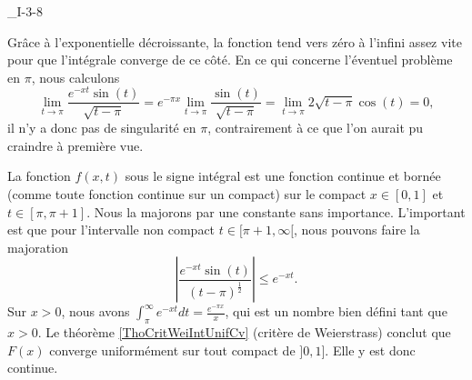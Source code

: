 

\begin{corrige}{_I-3-8}

Grâce à l'exponentielle décroissante, la fonction tend vers zéro à l'infini assez vite pour que l'intégrale converge de ce côté. En ce qui concerne l'éventuel problème en $\pi$, nous calculons
\begin{equation}
	\lim_{t\to\pi}\frac{  e^{-xt}\sin(t) }{ \sqrt{t-\pi} }= e^{-\pi x}\lim_{t\to\pi}\frac{\sin(t) }{ \sqrt{t-\pi} }=\lim_{t\to\pi}2\sqrt{t-\pi}\cos(t)=0,
\end{equation}
il n'y a donc pas de singularité en $\pi$, contrairement à ce que l'on aurait pu craindre à première vue. 

La fonction  $f(x,t)$ sous le signe intégral est une fonction continue et bornée (comme toute fonction continue sur un compact) sur le compact $x\in[0,1]$ et $t\in[\pi,\pi+1]$. Nous la majorons par une constante sans importance. L'important est que pour l'intervalle non compact $t\in[\pi+1,\infty[$, nous pouvons faire la majoration 
\begin{equation}
	\left| \frac{  e^{-xt}\sin(t) }{ (t-\pi)^{\frac{1}{ 2 }} } \right| \leq e^{-xt}.
\end{equation}
Sur $x>0$, nous avons $\int_{\pi}^{\infty} e^{-xt}dt=\frac{  e^{-\pi x} }{ x }$, qui est un nombre bien défini tant que $x>0$. Le théorème \ref{ThoCritWeiIntUnifCv} (critère de Weierstrass) conclut que $F(x)$ converge uniformément sur tout compact de $]0,1]$. Elle y est donc continue.

\end{corrige}
